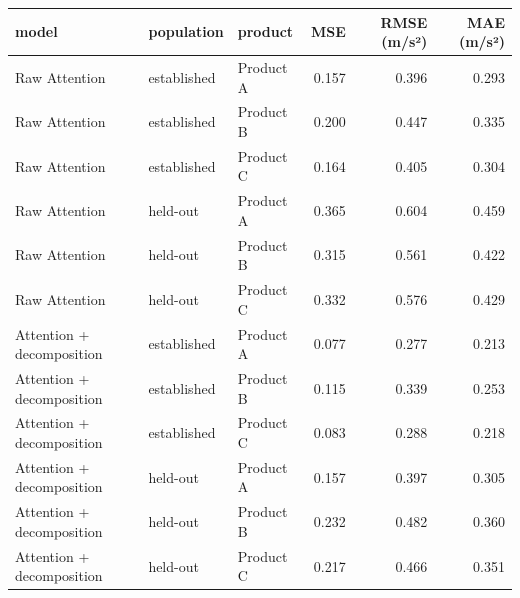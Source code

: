 \begin{tabular}{lllrrr}
\toprule
model & population & product & MSE & RMSE (m/s²) & MAE (m/s²) \\
\midrule
Raw Attention & established & Product A & 0.157 & 0.396 & 0.293 \\
Raw Attention & established & Product B & 0.200 & 0.447 & 0.335 \\
Raw Attention & established & Product C & 0.164 & 0.405 & 0.304 \\
Raw Attention & held-out & Product A & 0.365 & 0.604 & 0.459 \\
Raw Attention & held-out & Product B & 0.315 & 0.561 & 0.422 \\
Raw Attention & held-out & Product C & 0.332 & 0.576 & 0.429 \\
Attention + decomposition & established & Product A & 0.077 & 0.277 & 0.213 \\
Attention + decomposition & established & Product B & 0.115 & 0.339 & 0.253 \\
Attention + decomposition & established & Product C & 0.083 & 0.288 & 0.218 \\
Attention + decomposition & held-out & Product A & 0.157 & 0.397 & 0.305 \\
Attention + decomposition & held-out & Product B & 0.232 & 0.482 & 0.360 \\
Attention + decomposition & held-out & Product C & 0.217 & 0.466 & 0.351 \\
\bottomrule
\end{tabular}
